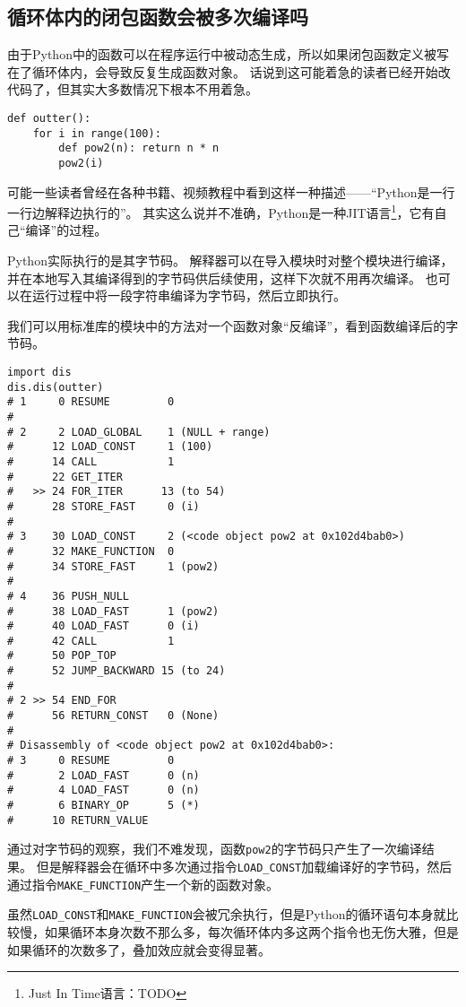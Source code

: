 \documentclass{ctexbook}
\begin{document}
\subsection{循环体内的闭包函数会被多次编译吗}

由于Python中的函数可以在程序运行中被动态生成，所以如果闭包函数定义被写在了循环体内，会导致反复生成函数对象。
话说到这可能着急的读者已经开始改代码了，但其实大多数情况下根本不用着急。

\begin{verbatim}
def outter():
    for i in range(100):
        def pow2(n): return n * n
        pow2(i)
\end{verbatim}

可能一些读者曾经在各种书籍、视频教程中看到这样一种描述——``Python是一行一行边解释边执行的''。
其实这么说并不准确，Python是一种JIT语言\footnote{Just In Time语言：TODO}，它有自己``编译''的过程。

Python实际执行的是其字节码。
解释器可以在导入模块时对整个模块进行编译，并在本地写入其编译得到的字节码供后续使用，这样下次就不用再次编译。
也可以在运行过程中将一段字符串编译为字节码，然后立即执行。

我们可以用标准库的模块中的方法对一个函数对象``反编译''，看到函数编译后的字节码。

\begin{verbatim}
import dis
dis.dis(outter)
# 1     0 RESUME         0
# 
# 2     2 LOAD_GLOBAL    1 (NULL + range)
#      12 LOAD_CONST     1 (100)
#      14 CALL           1
#      22 GET_ITER
#   >> 24 FOR_ITER      13 (to 54)
#      28 STORE_FAST     0 (i)
# 
# 3    30 LOAD_CONST     2 (<code object pow2 at 0x102d4bab0>)
#      32 MAKE_FUNCTION  0
#      34 STORE_FAST     1 (pow2)
# 
# 4    36 PUSH_NULL
#      38 LOAD_FAST      1 (pow2)
#      40 LOAD_FAST      0 (i)
#      42 CALL           1
#      50 POP_TOP
#      52 JUMP_BACKWARD 15 (to 24)
# 
# 2 >> 54 END_FOR
#      56 RETURN_CONST   0 (None)
# 
# Disassembly of <code object pow2 at 0x102d4bab0>:
# 3     0 RESUME         0
#       2 LOAD_FAST      0 (n)
#       4 LOAD_FAST      0 (n)
#       6 BINARY_OP      5 (*)
#      10 RETURN_VALUE
\end{verbatim}

通过对字节码的观察，我们不难发现，函数\verb|pow2|的字节码只产生了一次编译结果。
但是解释器会在循环中多次通过指令\verb|LOAD_CONST|加载编译好的字节码，然后通过指令\verb|MAKE_FUNCTION|产生一个新的函数对象。

虽然\verb|LOAD_CONST|和\verb|MAKE_FUNCTION|会被冗余执行，但是Python的循环语句本身就比较慢，如果循环本身次数不那么多，每次循环体内多这两个指令也无伤大雅，但是如果循环的次数多了，叠加效应就会变得显著。
\end{document}
